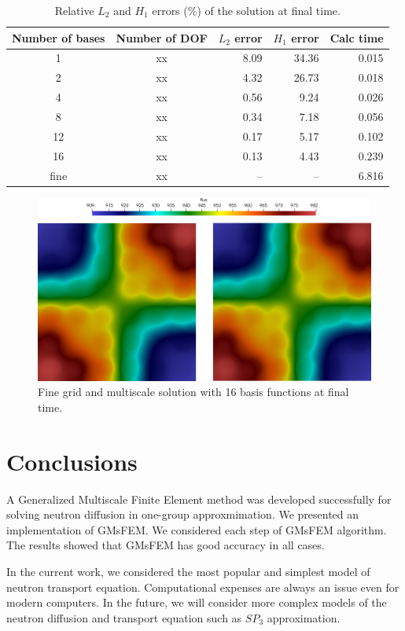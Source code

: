 \documentclass[runningheads]{llncs}
\begin{document}
\begin{table}[h!]
\caption{Relative $L_2$ and $H_1$ errors ($\%$) of the solution at final time.}
\label{t2}
\begin{center}
\begin{tabular}{|c|c|r|r|r|}
\hline
Number of bases & Number of DOF & $L_2$ error & $H_1$ error & Calc time\\
\hline
1 & xx & 8.09 & 34.36 & 0.015 \\
2 & xx & 4.32 & 26.73 & 0.018 \\
4 & xx & 0.56 & 9.24 & 0.026 \\
8 & xx & 0.34 & 7.18 & 0.056 \\
12 & xx & 0.17 & 5.17 & 0.102 \\
16 & xx & 0.13 & 4.43 & 0.239 \\
fine & xx & -- & -- & 6.816 \\
\hline
\end{tabular}
\end{center}
\end{table}

\begin{figure}[h!]
\centering
\includegraphics[width=0.75\linewidth]{flux.png} 
\caption{Fine grid and multiscale solution with 16 basis functions at final time.}
\label{p6}
\end{figure} 

\section{Conclusions}
A Generalized Multiscale Finite Element method was developed successfully for solving neutron diffusion in one-group approxmimation.  
We presented an implementation of GMsFEM. 
We considered each step of GMsFEM algorithm.
The results showed that GMsFEM has good accuracy in all cases.

In the current work, we considered the most popular and simplest model of neutron transport equation.
Computational expenses are always an issue even for modern computers.
In the future, we will consider more complex models of the neutron diffusion and transport equation such as $SP_3$ approximation. 
\end{document}
